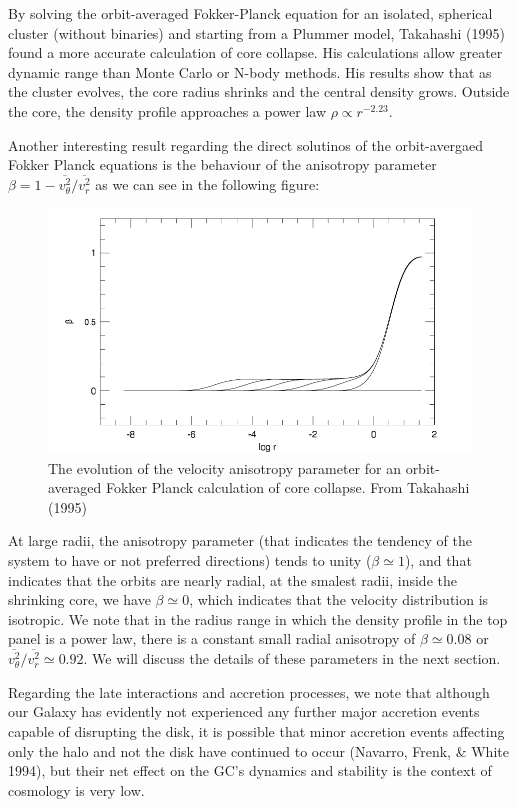 By solving the orbit-averaged Fokker-Planck equation for an isolated, spherical cluster (without binaries) and starting from a Plummer model, Takahashi (1995) found a more accurate calculation of core collapse. His calculations allow greater dynamic range than Monte Carlo or N-body methods. His results show that as the cluster evolves, the core radius shrinks  and the central density grows. Outside the core, the density profile approaches a power law $\rho\varpropto r^{-2.23}$.

Another interesting result regarding the direct solutinos of the orbit-avergaed Fokker Planck equations is the behaviour of the anisotropy parameter $\beta=1-\overline{v_{\theta}^{2}}/\overline{v_{r}^{2}}$ as we can see in the following figure:

\begin{figure}[H]
\centering
\includegraphics[width=12cm]{images/anisotropy_core_collapse.png}
\caption[Evolution of the velocity anisotropy parameter]{The evolution of the velocity anisotropy parameter for an orbit-averaged Fokker Planck calculation of core collapse. From Takahashi (1995)}
\end{figure}

At large radii, the anisotropy parameter (that indicates the tendency of the system to have or not preferred directions) tends to unity ($\beta\simeq1$), and that indicates that the orbits are nearly radial, at the smalest radii, inside the shrinking core, we have $\beta\simeq0$, which indicates that the velocity distribution is isotropic. We note that in the radius range in which the density profile in the top panel is a power law, there is a constant small radial anisotropy of $\beta\simeq0.08$ or  $\overline{v_{\theta}^{2}}/\overline{v_{r}^{2}}\simeq0.92$. We will discuss the details of these parameters in the next section.

Regarding the late interactions and accretion processes, we note that although our Galaxy has evidently not experienced any further major accretion events capable of disrupting the disk, it is possible that minor accretion events affecting only the halo and not the disk have continued to occur (Navarro, Frenk, \& White 1994), but their net effect on the GC's dynamics and stability is the context of cosmology is very low.

